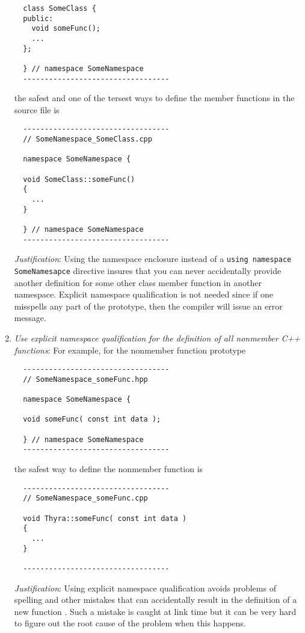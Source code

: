 \begin{enumerate}
{\begin{verbatim}
  class SomeClass {
  public:
    void someFunc();
    ...
  };

  } // namespace SomeNamespace
  ----------------------------------
\end{verbatim}}

the safest and one of the tersest ways to define the member functions in the
source file is

{\small\begin{verbatim}
  ----------------------------------
  // SomeNamespace_SomeClass.cpp

  namespace SomeNamespace {

  void SomeClass::someFunc()
  {
    ...
  }

  } // namespace SomeNamespace
  ----------------------------------
\end{verbatim}}

{}\textit{Justification}: Using the namespace enclosure instead of a
{}\texttt{using namespace SomeNamesapce} directive insures that you can never
accidentally provide another definition for some other class member function
in another namespace.  Explicit namespace qualification is not needed since if
one misspells any part of the prototype, then the compiler will issue an error
message.

{}\item\textit{Use explicit namespace qualification for the definition of all
nonmember C++ functions}: For example, for the nonmember function prototype

{\small\begin{verbatim}
  ----------------------------------
  // SomeNamespace_someFunc.hpp

  namespace SomeNamespace {

  void someFunc( const int data );

  } // namespace SomeNamespace
  ----------------------------------
\end{verbatim}}

the safest way to define the nonmember function is

{\small\begin{verbatim}
  ----------------------------------
  // SomeNamespace_someFunc.cpp

  void Thyra::someFunc( const int data )
  {
    ...
  }

  ----------------------------------
\end{verbatim}}

{}\textit{Justification}: Using explicit namespace qualification avoids
problems of spelling and other mistakes that can accidentally result in the
definition of a new function {}\cite[Section 8.2]{stroustrup97}.  Such a
mistake is caught at link time but it can be very hard to figure out the root
cause of the problem when this happens.


\end{enumerate}

